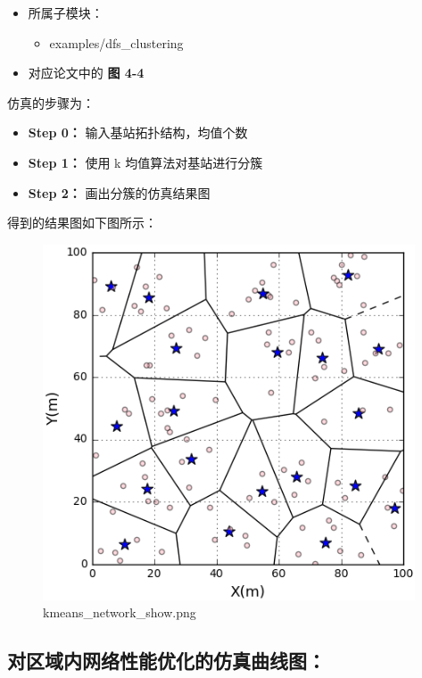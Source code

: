 \documentclass[11pt]{article}
\makeatletter
\def\maxwidth{\ifdim\Gin@nat@width>\linewidth\linewidth
    \else\Gin@nat@width\fi}
\let\Oldincludegraphics\includegraphics
\renewcommand{\includegraphics}[1]{\Oldincludegraphics[width=.8\maxwidth]{#1}}
\providecommand{\tightlist}{%
      \setlength{\itemsep}{0pt}\setlength{\parskip}{0pt}}
\makeatother
\begin{document}
\begin{itemize}
\tightlist
\item
  所属子模块：

  \begin{itemize}
  \tightlist
  \item
    examples/dfs\_clustering
  \end{itemize}
\item
  对应论文中的 \textbf{图 4-4}
\end{itemize}

仿真的步骤为：

\begin{itemize}
\tightlist
\item
  \textbf{Step 0：} 输入基站拓扑结构，均值个数
\item
  \textbf{Step 1：} 使用 k 均值算法对基站进行分簇
\item
  \textbf{Step 2：} 画出分簇的仿真结果图
\end{itemize}

得到的结果图如下图所示：

\begin{figure}[htbp]
\centering
\includegraphics{kmeans_network_show.png}
\caption{kmeans\_network\_show.png}
\end{figure}

    \subsection{对区域内网络性能优化的仿真曲线图：}\label{ux5bf9ux533aux57dfux5185ux7f51ux7edcux6027ux80fdux4f18ux5316ux7684ux4effux771fux66f2ux7ebfux56fe}
\end{document}
